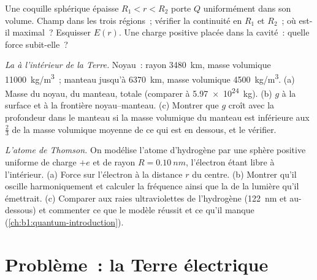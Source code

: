 \begin{exercise}[$\star\star\star$]\label{exo:b1:electrostatics-gauss:10}
Une coquille sphérique épaisse $R_1 < r < R_2$ porte $Q$ uniformément dans son
volume. Champ dans les trois régions~; vérifier la continuité en $R_1$ et
$R_2$~; où est-il maximal~? Esquisser $E(r)$. Une charge positive placée dans
la cavité~: quelle force subit-elle~?
\end{exercise}

\begin{exercise}[$\star\star\star$]\label{exo:b1:electrostatics-gauss:11}
\emph{La  à l'intérieur de la Terre.} Noyau~: rayon \qty{3480}{km},
masse volumique \qty{11000}{kg/m^3}~; manteau jusqu'à \qty{6370}{km}, masse
volumique \qty{4500}{kg/m^3}. (a) Masse du noyau, du manteau, totale (comparer
à \qty{5.97e24}{kg}). (b) $g$ à la surface et à la frontière noyau--manteau.
(c) Montrer que $g$ croît avec la profondeur dans le manteau si la masse
volumique du manteau est inférieure aux $\tfrac23$ de la masse volumique
moyenne de ce qui est en dessous, et le vérifier.
\end{exercise}

\begin{exercise}[$\star\star\star$]\label{exo:b1:electrostatics-gauss:12}
\emph{L'atome de Thomson.} On modélise l'atome d'hydrogène par une sphère
positive uniforme de charge $+e$ et de rayon $R = \qty{0.10}{nm}$, l'électron
étant libre à l'intérieur. (a) Force sur l'électron à la distance $r$ du
centre. (b) Montrer qu'il oscille harmoniquement et calculer la fréquence
ainsi que la  de la lumière qu'il émettrait. (c) Comparer aux
raies ultraviolettes de l'hydrogène (\qty{122}{nm} et au-dessous) et commenter
ce que le modèle réussit et ce qu'il manque (\cref{ch:b1:quantum-introduction}).
\end{exercise}

\section{Problème~: la Terre électrique}

